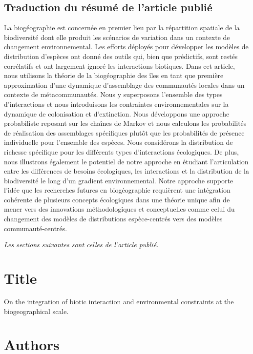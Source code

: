 \subsection{Traduction du résumé de l'article publié}

La biogéographie est concernée en premier lieu par la répartition spatiale de la
biodiversité dont elle produit les scénarios de variation dans un contexte de
changement environnemental. Les efforts déployés pour développer les modèles de
distribution d'espèces ont donné des outils qui, bien que prédictifs, sont
restés corrélatifs et ont largement ignoré les interactions biotiques.
Dans cet article, nous utilisons la théorie de la biogéographie des îles
en tant que première approximation d'une dynamique d'assemblage des communautés
locales dans un contexte de métacommunautés. Nous y superposons l'ensemble des
types d'interactions et nous introduisons les contraintes environnementales sur
la dynamique de colonisation et d'extinction. Nous développons une approche
probabiliste reposant sur les chaînes de Markov et nous calculons les
probabilités de réalisation des assemblages spécifiques plutôt que les
probabilités de présence individuelle pour l'ensemble des espèces.
Nous considérons la distribution de richesse spécifique pour les différents
types d'interactions écologiques.
De plus, nous illustrons également le potentiel de notre approche en étudiant
l'articulation entre les différences de besoins écologiques, les interactions
et la distribution de la biodiversité le long d'un gradient environnemental.
Notre approche supporte l'idée que les recherches futures en biogéographie
requièrent une intégration cohérente de plusieurs concepts écologiques dans une
théorie unique afin de mener vers des innovations méthodologiques et
conceptuelles comme celui du changement des modèles de distributions espèce-centrés
vers des modèles communauté-centrés.


\emph{Les sections suivantes sont celles de l'article publié.}




\section{Title}

On the integration of biotic interaction and environmental constraints at the biogeographical scale.

\section{Authors}

